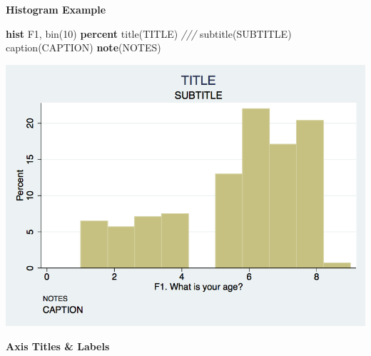 \documentclass[
]{book}
\newenvironment{Shaded}{\begin{snugshade}}{\end{snugshade}}
\newcommand{\BaseNTok}[1]{\textcolor[rgb]{0.00,0.00,0.81}{#1}}
\newcommand{\CommentTok}[1]{\textcolor[rgb]{0.56,0.35,0.01}{\textit{#1}}}
\newcommand{\KeywordTok}[1]{\textcolor[rgb]{0.13,0.29,0.53}{\textbf{#1}}}
\newcommand{\NormalTok}[1]{#1}
\begin{document}
\textbf{Histogram Example}

\begin{Shaded}
\begin{Highlighting}[]
  \KeywordTok{hist}\NormalTok{ F1, }\BaseNTok{bin}\NormalTok{(10) }\KeywordTok{percent} \BaseNTok{title}\NormalTok{(TITLE) }\CommentTok{///}
    \BaseNTok{subtitle}\NormalTok{(SUBTITLE) }\BaseNTok{caption}\NormalTok{(CAPTION) }\KeywordTok{note}\NormalTok{(NOTES)}
\end{Highlighting}
\end{Shaded}

\includegraphics{Stata/StataModGraph/images/hist1.png}

\textbf{Axis Titles \& Labels}
\end{document}
